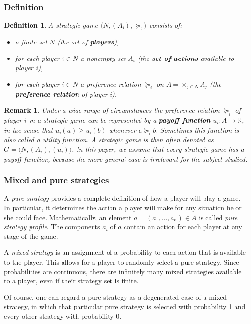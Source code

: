 \documentclass[a4paper,11pt]{article}
\newtheorem{definition}[theorem]{Definition}
\newtheorem{remark}[theorem]{Remark}
\newcommand{\R}{{\mathbb R}}
\begin{document}
\subsubsection{Definition}
\begin{definition}\cite{2}
A strategic game $\langle N, (A_i), \succeq_i\rangle$ consists of:
\begin{itemize}
  \item a finite set $N$  (the set of \textbf{players}),
  \item for each player $i \in N$ a nonempty set $A_i$ (the \textbf{set of actions} available to player i),
  \item for each player $i \in N$ a preference relation $\succeq_i$ on $A=\times_{j\in N}A_j$ (the \textbf{preference relation} of player i).
\end{itemize}
\end{definition}
\begin{remark}
Under a wide range of circumstances the preference relation  $\succeq_i$ of player $i$ in a strategic game can be represented by a \textbf{payoff function} $u_i: A \rightarrow \R$, in the sense that $u_i(a) \geq u_i(b)$ whenever $a \succeq_i b$. Sometimes this function is also called a utility function. A strategic game is then often denoted as $G = \langle N, (A_i), (u_i)\rangle$. In this paper, we assume that every strategic game has a payoff function, because the more general case is irrelevant for the subject studied.
\end{remark}


\subsubsection{Mixed and pure strategies}
A \emph{pure strategy} provides a complete definition of how a player will play a game. In particular, it determines the action a player will make for any situation he or she could face. Mathematically, an element $a = (a_1,...,a_n) \in A$ is called \emph{pure strategy profile}. The components $a_i$ of $a$ contain an action for each player at any stage of the game.

A \emph{mixed strategy} is an assignment of a probability to each action that is available to the player. This allows for a player to randomly select a pure strategy. Since probabilities are continuous, there are infinitely many mixed strategies available to a player, even if their strategy set is finite.

Of course, one can regard a pure strategy as a degenerated case of a mixed strategy, in which that particular pure strategy is selected with probability 1 and every other strategy with probability 0.
\end{document}
